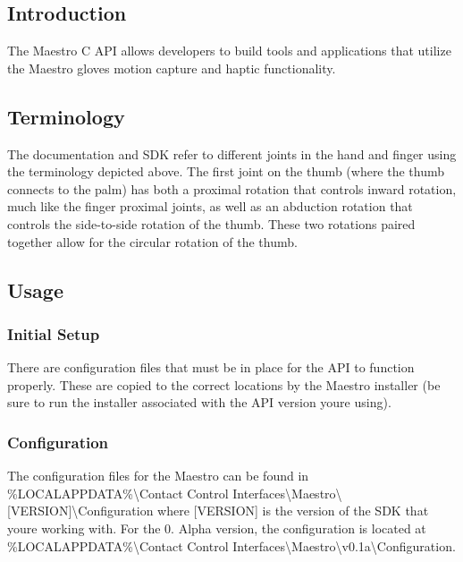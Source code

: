 

\subsection*{Introduction}

The Maestro C A\+PI allows developers to build tools and applications that utilize the Maestro glove\textquotesingle{}s motion capture and haptic functionality.

\subsection*{Terminology}



The documentation and S\+DK refer to different joints in the hand and finger using the terminology depicted above. The first joint on the thumb (where the thumb connects to the palm) has both a proximal rotation that controls inward rotation, much like the finger proximal joints, as well as an abduction rotation that controls the side-\/to-\/side rotation of the thumb. These two rotations paired together allow for the circular rotation of the thumb.

\subsection*{Usage}

\subsubsection*{Initial Setup}

There are configuration files that must be in place for the A\+PI to function properly. These are copied to the correct locations by the Maestro installer (be sure to run the installer associated with the A\+PI version you\textquotesingle{}re using).

\label{_configHeader}%


\subsubsection*{Configuration}

The configuration files for the Maestro can be found in {\ttfamily \%L\+O\+C\+A\+L\+A\+P\+P\+D\+A\+TA\%\textbackslash{}Contact Control Interfaces\textbackslash{}Maestro\textbackslash{}\mbox{[}V\+E\+R\+S\+I\+ON\mbox{]}\textbackslash{}Configuration} where {\ttfamily \mbox{[}V\+E\+R\+S\+I\+ON\mbox{]}} is the version of the S\+DK that you\textquotesingle{}re working with. For the 0. Alpha version, the configuration is located at {\ttfamily \%L\+O\+C\+A\+L\+A\+P\+P\+D\+A\+TA\%\textbackslash{}Contact Control Interfaces\textbackslash{}Maestro\textbackslash{}v0.\+1a\textbackslash{}Configuration}.

